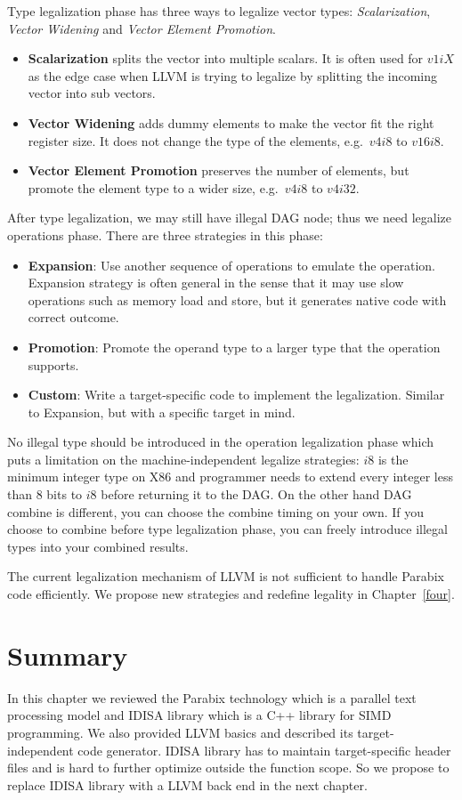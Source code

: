 Type legalization phase has three ways to legalize vector types\cite{hybrid_simd_type_legalize}: \textit{Scalarization}, \textit{Vector Widening} and \textit{Vector Element Promotion}.

\begin{itemize}
    \item \textbf{Scalarization} splits the vector into multiple scalars. It is often used for $v1iX$ as the edge case when LLVM is trying to legalize by splitting the incoming vector into sub vectors.
    \item \textbf{Vector Widening} adds dummy elements to make the vector fit the right register size. It does not change the type of the elements, e.g.\ $v4i8$ to $v16i8$.
    \item \textbf{Vector Element Promotion} preserves the number of elements, but promote the element type to a wider size, e.g.\ $v4i8$ to $v4i32$.
\end{itemize}

After type legalization, we may still have illegal DAG node; thus we need legalize operations phase. There are three strategies in this phase:

\begin{itemize}
    \item \textbf{Expansion}: Use another sequence of operations to emulate the operation. Expansion strategy is often general in the sense that it may use slow operations such as memory load and store, but it generates native code with correct outcome.
    \item \textbf{Promotion}: Promote the operand type to a larger type that the operation supports.
    \item \textbf{Custom}: Write a target-specific code to implement the legalization. Similar to Expansion, but with a specific target in mind.
\end{itemize}

No illegal type should be introduced in the operation legalization phase which puts a limitation on the machine-independent legalize strategies: $i8$ is the minimum integer type on X86 and programmer needs to extend every integer less than 8 bits to $i8$ before returning it to the DAG\@. On the other hand DAG combine is different, you can choose the combine timing on your own. If you choose to combine before type legalization phase, you can freely introduce illegal types into your combined results.

The current legalization mechanism of LLVM is not sufficient to handle Parabix code efficiently. We propose new strategies and redefine legality in Chapter~\ref{four}.

\section{Summary}
In this chapter we reviewed the Parabix technology which is a parallel text processing model and IDISA library which is a C++ library for SIMD programming. We also provided LLVM basics and described its target-independent code generator. IDISA library has to maintain target-specific header files and is hard to further optimize outside the function scope. So we propose to replace IDISA library with a LLVM back end in the next chapter.
